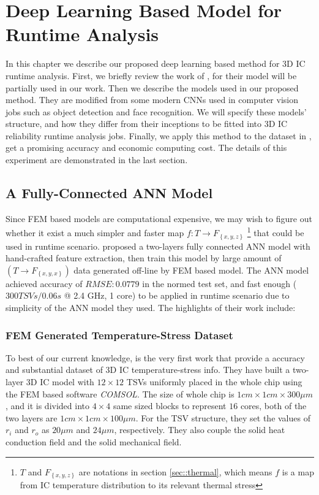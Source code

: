 
\chapter{Deep Learning Based Model for Runtime Analysis}
In this chapter we describe our proposed deep learning based method for 3D IC runtime analysis.
First, we briefly review the work of \cite{Zhang2016Fast}, for their model
will be partially used in our work.
Then we describe the models used in our proposed method. They are modified from some modern
CNNs used in computer vision jobs such as object detection and face recognition.
We will specify these models' structure, and how they differ from their inceptions
to be fitted into 3D IC reliability runtime analysis jobs.
Finally, we apply this method to the dataset in \cite{Zhang2016Fast},
get a promising accuracy and economic computing cost.
The details of this experiment are demonstrated in the last section.

\section{A Fully-Connected ANN Model}
Since FEM based models are computational expensive, we may wish to figure out whether
it exist a much simpler and faster map $f: T \to F_{\left\{ x,y,z \right\}}$
\footnote{$T$ and $F_{\left\{ x,y,z \right\}}$ are notations in section \ref{sec::thermal}, which means
$f$ is a map from IC temperature distribution to its relevant thermal stress}
that could be used in runtime scenario.
\cite{Zhang2016Fast} proposed a two-layers fully connected ANN model with hand-crafted
feature extraction, then train this model by large amount of $(T \to F_{\left\{x,y,x\right\}})$ data
generated off-line by FEM based model. 
The ANN model achieved accuracy of $RMSE: 0.0779$ in the normed test set, and fast enough 
($300 TSVs / 0.06s$ @ 2.4 GHz, 1 core) to be applied
in runtime scenario due to simplicity of the ANN model they used.
The highlights of their work include:

\subsection{FEM Generated Temperature-Stress Dataset}
To best of our current knowledge, \cite{Zhang2016Fast} is the very first work that provide a
accuracy and substantial dataset of 3D IC temperature-stress info.
They have built a two-layer 3D IC model with $12\times12$ TSVs uniformly placed
in the whole chip using the FEM based software \textit{COMSOL}.
The size of whole chip is $1cm\times1cm\times300\mu m$, and it is
divided into $4\times4$ same sized blocks to represent $16$ cores,
both of the two layers are $1cm\times1cm\times100\mu m$. 
For the TSV structure, they set the values of $r_i$ and $r_o$
as $20\mu m$ and $24\mu m$, respectively. They also couple
the solid heat conduction field and the solid mechanical field.

